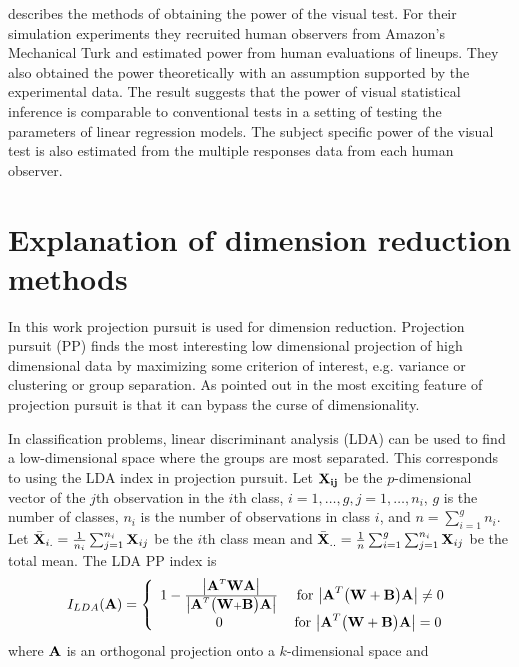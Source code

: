 \cite{majumder:2011} describes the methods of obtaining the power of the visual test. For their simulation experiments they recruited human observers from Amazon's Mechanical Turk \citep{turk} and estimated power from human evaluations of lineups. They also obtained the power theoretically with an assumption supported by the experimental data. The result suggests that the power of visual statistical inference is comparable to conventional tests in a setting of testing the parameters of linear regression models. The subject specific power of the visual test is also estimated from the multiple responses data from each human observer. 

 
\section{Explanation of dimension reduction methods}  \label{sec:dimred}

In this work projection pursuit \citep[e.g.][]{friedman:1974}  is used for dimension reduction. Projection pursuit (PP) finds the most interesting low dimensional projection of high dimensional data by maximizing some criterion of interest, e.g. variance or clustering or group separation. As pointed out in \cite{huber:1985} the most exciting feature of projection pursuit is that it can bypass the curse of dimensionality. 

In classification problems, linear discriminant analysis (LDA) can be used to find a low-dimensional space where the groups are most separated. This corresponds to using the LDA index \citep{lee:2009} in projection pursuit. Let $\bf{X_{ij}}$ be the $p$-dimensional vector of the $j$th observation in the $i$th class, $i = 1, \dots, g, j = 1, \dots, n_i$, $g$ is the number of classes, $n_i$ is the number of observations in class $i$, and $n = \sum_{i = 1}^g n_i$. Let $\bar{\mbox{\boldmath {\bf X}}}_{i.} = \frac{1}{n_i} \sum_{j=1}^{n_i} \mbox{\boldmath {\bf X}}_{ij}$
be the $i$th class mean and $\bar{\mbox{\boldmath {\bf X}}}_{..} =
\frac{1}{n}\sum_{i=1}^g \sum_{j=1}^{n_i} \mbox{\boldmath {\bf X}}_{ij}$ be the total
mean. The LDA PP index is
\begin{equation}
I_{LDA} ({\mbox{\boldmath {\bf A}}}) = \left \{ \begin{array}{cc}
                       1-\frac{\big|{\mbox{\boldmath {\bf A}}}^T\mbox{\boldmath {\bf W}}{\mbox{\boldmath {\bf A}}}\big|}{\big|{\mbox{\boldmath {\bf A}}}^T\big
                                  (\mbox{\boldmath {\bf W}} + \mbox{\boldmath {\bf B}}\big){\mbox{\boldmath {\bf A}}}\big|} &
                       \mbox{ for $\big|{\mbox{\boldmath {\bf A}}}^T\big(\mbox{\boldmath {\bf W}} + \mbox{\boldmath {\bf B}}\big) {\mbox{\boldmath {\bf A}}}\big| \ne 0$}\\
                       0 & \mbox{for  $\big|{\mbox{\boldmath {\bf A}}}^T\big(\mbox{\boldmath {\bf W}} + \mbox{\boldmath {\bf B}}\big) {\mbox{\boldmath {\bf A}}}\big| = 0$}
                       \end{array}
               \right.
\end{equation}
where $\mbox{\boldmath {\bf A}}$ is an orthogonal projection onto a $k$-dimensional space and

